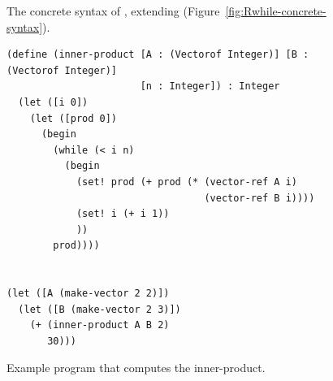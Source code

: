 \documentclass[11pt]{book}
\newcommand{\gray}[1]{{\color{gray} #1}}
\begin{document}
\begin{figure}[tp]
\centering
\fbox{
  \begin{minipage}{0.96\textwidth}
    \small
\[
\begin{array}{lcl}
  \Type &::=& \ldots \mid \LP \key{Vectorof}~\Type \RP \\
  \Exp &::=& \gray{ \Int \mid \CREAD{} \mid \CNEG{\Exp}
     \mid \CADD{\Exp}{\Exp} \mid \CSUB{\Exp}{\Exp} }  \mid \CMUL{\Exp}{\Exp}\\
    &\mid&  \gray{ \Var \mid \CLET{\Var}{\Exp}{\Exp} }\\
    &\mid& \gray{\key{\#t} \mid \key{\#f} 
     \mid \LP\key{and}\;\Exp\;\Exp\RP 
     \mid \LP\key{or}\;\Exp\;\Exp\RP 
     \mid \LP\key{not}\;\Exp\RP } \\
    &\mid& \gray{ \LP\key{eq?}\;\Exp\;\Exp\RP \mid \CIF{\Exp}{\Exp}{\Exp} } \\
    &\mid& \gray{ \LP\key{vector}\;\Exp\ldots\RP \mid
          \LP\key{vector-ref}\;\Exp\;\Int\RP} \\
    &\mid& \gray{\LP\key{vector-set!}\;\Exp\;\Int\;\Exp\RP\mid \LP\key{void}\RP
    \mid \LP\Exp \; \Exp\ldots\RP } \\
    &\mid& \gray{ \LP \key{procedure-arity}~\Exp\RP 
    \mid \CLAMBDA{\LP\LS\Var \key{:} \Type\RS\ldots\RP}{\Type}{\Exp} } \\
  &\mid& \gray{ \CSETBANG{\Var}{\Exp}
  \mid \CBEGIN{\Exp\ldots}{\Exp}
  \mid \CWHILE{\Exp}{\Exp} } \\
  &\mid& \CMAKEVEC{\Exp}{\Exp} \\
  \Def &::=& \gray{ \CDEF{\Var}{\LS\Var \key{:} \Type\RS\ldots}{\Type}{\Exp} } \\
  \LangArray{} &::=& \gray{\Def\ldots \; \Exp}
\end{array}
\]
\end{minipage}
}
\caption{The concrete syntax of \LangArray{}, extending \LangLoop{} (Figure~\ref{fig:Rwhile-concrete-syntax}).}
\label{fig:Rvecof-concrete-syntax}
\end{figure}


\begin{figure}[tp]
\begin{lstlisting}
(define (inner-product [A : (Vectorof Integer)] [B : (Vectorof Integer)]
                       [n : Integer]) : Integer
  (let ([i 0])
    (let ([prod 0])
      (begin
        (while (< i n)
          (begin
            (set! prod (+ prod (* (vector-ref A i)
                                  (vector-ref B i))))
            (set! i (+ i 1))
            ))
        prod))))
  

(let ([A (make-vector 2 2)])
  (let ([B (make-vector 2 3)])
    (+ (inner-product A B 2)
       30)))
\end{lstlisting}
\caption{Example program that computes the inner-product.}
\label{fig:inner-product}
\end{figure}
\end{document}
